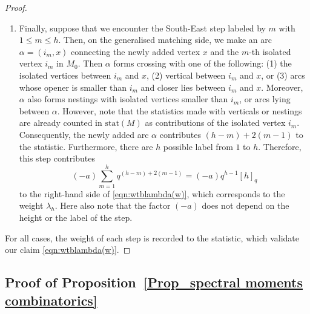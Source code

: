 \documentclass{amsart}
\theoremstyle{plain}
\theoremstyle{remark}
\numberwithin{equation}{section}
\begin{document}
\begin{proof}
\begin{enumerate}
        \item Finally, suppose that we encounter the South-East step labeled by $m$ with $1\leq m\leq h$. Then, on the generalised matching side, we make an arc $\alpha=(i_m, x)$ connecting the newly added vertex $x$ and the $m$-th isolated vertex $i_m$ in $M_0$. Then $\alpha$ forms crossing with one of the following: (1) the isolated vertices between $i_m$ and $x$, (2) vertical between $i_m$ and $x$, or (3) arcs whose opener is smaller than $i_m$ and closer lies between $i_m$ and $x$. Moreover, $\alpha$ also forms nestings with isolated vertices smaller than $i_m$, or arcs lying between $\alpha$. However, note that the statistics made with verticals or nestings are already counted in $\mathrm{stat}(M)$ as contributions of the isolated vertex $i_m$. Consequently, the newly added arc $\alpha$ contributes $(h-m)+2(m-1)$ to the statistic. Furthermore, there are $h$ possible label from $1$ to $h$. Therefore, this step contributes
        \begin{equation*}
            (-a) \sum_{m=1}^{h}q^{(h-m)+2(m-1)}=(-a)q^{h-1}[h]_{q}
        \end{equation*}
        to the right-hand side of \eqref{eqn:wtblambda(w)}, which corresponds to the weight $\lambda_h$. Here also note that the factor $(-a)$ does not depend on the height or the label of the step.
    \end{enumerate}
    For all cases, the weight of each step is recorded to the statistic, which validate our claim \eqref{eqn:wtblambda(w)}.
\end{proof}



\subsection{Proof of Proposition~\ref{Prop_spectral moments combinatorics}}

 
\end{document}
